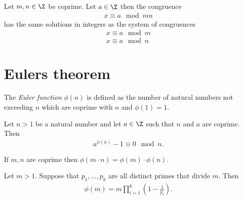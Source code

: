 \documentclass{article}
\begin{document}
\begin{theorem}
    Let $m,n\in\Z$ be coprime. Let $a\in\Z$ then the congruence
    \begin{align*}
        x \equiv a \mod mn
    \end{align*}
    has the same solutions in integers as the system of congruences 
    \begin{align*}
        x \equiv a \mod m\\
        x \equiv a \mod n
    \end{align*}
\end{theorem}

\section{Eulers theorem}

\begin{definition}
    The \emph{Euler function $\phi(n)$} is defined as the number of natural numbers not exceeding 
    $n$ which are coprime with $n$ and $\phi(1)=1$.
\end{definition}

\begin{theorem}[Euler]
    Let $n>1$ be a natural number and let $a\in\Z$ such that $n$ and $a$ are coprime. Then 
    \begin{align*}
        a^{\phi(n)}-1 \equiv 0 \mod n.
    \end{align*} 
\end{theorem}

\begin{theorem}
    If $m,n$ are coprime then $\phi(m\cdot n)=\phi(m)\cdot\phi(n)$.
\end{theorem}

\begin{theorem}
    Let $m>1$. Suppose that $p_1,...,p_k$ are all distinct primes that divide $m$. Then 
    \begin{align*}
        \phi(m) = m\prod_{i=1}^k \left(1-\frac{1}{p_i}\right).
    \end{align*}
\end{theorem}
\end{document}

